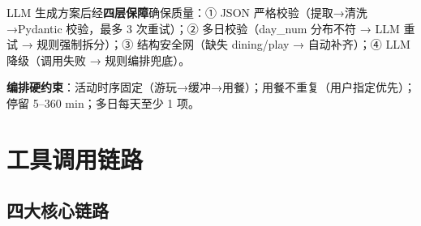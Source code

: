 \documentclass[10pt,a4paper]{ctexart}
\begin{document}
LLM 生成方案后经\textbf{四层保障}确保质量：① JSON 严格校验（提取→清洗→Pydantic 校验，最多 3 次重试）；② 多日校验（day\_num 分布不符 → LLM 重试 → 规则强制拆分）；③ 结构安全网（缺失 dining/play → 自动补齐）；④ LLM 降级（调用失败 → 规则编排兜底）。

\textbf{编排硬约束}：活动时序固定（游玩→缓冲→用餐）；用餐不重复（用户指定优先）；停留 5--360 min；多日每天至少 1 项。

\section{工具调用链路}

\subsection{四大核心链路}
\end{document}
